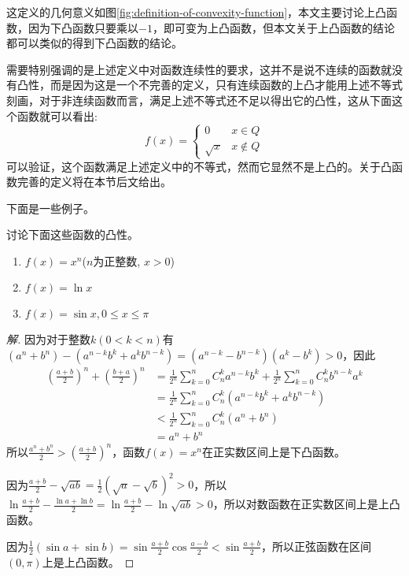 这定义的几何意义如图\ref{fig:definition-of-convexity-function}，本文主要讨论上凸函数，因为下凸函数只要乘以$-1$，即可变为上凸函数，但本文关于上凸函数的结论都可以类似的得到下凸函数的结论。

需要特别强调的是上述定义中对函数连续性的要求，这并不是说不连续的函数就没有凸性，而是因为这是一个不完善的定义，只有连续函数的上凸才能用上述不等式刻画，对于非连续函数而言，满足上述不等式还不足以得出它的凸性，这从下面这个函数就可以看出:
\begin{equation*}
  f(x) =
  \left\{
      \begin{array}{ll}
        0 & x \in Q \\
        \sqrt{x} &  x \notin Q
      \end{array}
  \right.
\end{equation*}
可以验证，这个函数满足上述定义中的不等式，然而它显然不是上凸的。关于凸函数完善的定义将在本节后文给出。

下面是一些例子。

\begin{example}
  讨论下面这些函数的凸性。
  \begin{enumerate}
  \item $f(x)=x^n$($n$为正整数, $x>0$)
  \item $f(x)=\ln{x}$
  \item $f(x)=\sin{x}, 0 \leqslant x \leqslant \pi$
  \end{enumerate}
\end{example}

\begin{proof}[解]
因为对于整数$k(0 < k < n)$有$(a^n+b^n)-(a^{n-k}b^k+a^kb^{n-k})=(a^{n-k}-b^{n-k})(a^k-b^k)>0$，因此
\begin{equation}
  \begin{split}
\left( \frac{a+b}{2} \right)^n + \left( \frac{b+a}{2} \right)^n & = \frac{1}{2^n} \sum_{k=0}^nC_n^ka^{n-k}b^k + \frac{1}{2^n}\sum_{k=0}^nC_n^kb^{n-k}a^k \\
& = \frac{1}{2^n} \sum_{k=0}^n C_n^k \left( a^{n-k}b^k+a^kb^{n-k} \right) \\
& < \frac{1}{2^n} \sum_{k=0}^n C_n^k \left( a^n+b^n \right) \\
& = a^n+b^n
\end{split}
\end{equation}
所以$\frac{a^n+b^n}{2}>\left( \frac{a+b}{2} \right)^n$，函数$f(x)=x^n$在正实数区间上是下凸函数。

因为$\frac{a+b}{2}-\sqrt{ab}=\frac{1}{2}(\sqrt{a}-\sqrt{b})^2>0$，所以 $\ln{\frac{a+b}{2}}-\frac{\ln{a}+\ln{b}}{2}=\ln{\frac{a+b}{2}}-\ln{\sqrt{ab}}>0$，所以对数函数在正实数区间上是上凸函数。

因为$\frac{1}{2}(\sin{a}+\sin{b})=\sin{\frac{a+b}{2}}\cos{\frac{a-b}{2}} < \sin{\frac{a+b}{2}}$，所以正弦函数在区间$(0,\pi)$上是上凸函数。
\end{proof}

